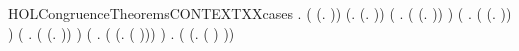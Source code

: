 \begin{SaveVerbatim}{HOLCongruenceTheoremsCONTEXTXXcases}
\HOLTokenTurnstile{} \HOLSymConst{\HOLTokenForall{}}.
         \HOLSymConst{\HOLTokenEquiv{}}
       ( \HOLSymConst{=} (\HOLTokenLambda{}. )) \HOLSymConst{\HOLTokenDisj{}} (\HOLSymConst{\HOLTokenExists{}}.  \HOLSymConst{=} (\HOLTokenLambda{}. )) \HOLSymConst{\HOLTokenDisj{}}
       (\HOLSymConst{\HOLTokenExists{}} . ( \HOLSymConst{=} (\HOLTokenLambda{}.  )) \HOLSymConst{\HOLTokenConj{}}  ) \HOLSymConst{\HOLTokenDisj{}}
       (\HOLSymConst{\HOLTokenExists{}} .
            ( \HOLSymConst{=} (\HOLTokenLambda{}.   \HOLSymConst{+}  )) \HOLSymConst{\HOLTokenConj{}}   \HOLSymConst{\HOLTokenConj{}}  ) \HOLSymConst{\HOLTokenDisj{}}
       (\HOLSymConst{\HOLTokenExists{}} .
            ( \HOLSymConst{=} (\HOLTokenLambda{}.   \HOLSymConst{\ensuremath{\parallel}}  )) \HOLSymConst{\HOLTokenConj{}}   \HOLSymConst{\HOLTokenConj{}}  ) \HOLSymConst{\HOLTokenDisj{}}
       (\HOLSymConst{\HOLTokenExists{}} . ( \HOLSymConst{=} (\HOLTokenLambda{}. \HOLConst{\ensuremath{\nu}}  ( ))) \HOLSymConst{\HOLTokenConj{}}  ) \HOLSymConst{\HOLTokenDisj{}}
       \HOLSymConst{\HOLTokenExists{}} . ( \HOLSymConst{=} (\HOLTokenLambda{}.  ( ) )) \HOLSymConst{\HOLTokenConj{}}  
\end{SaveVerbatim}
